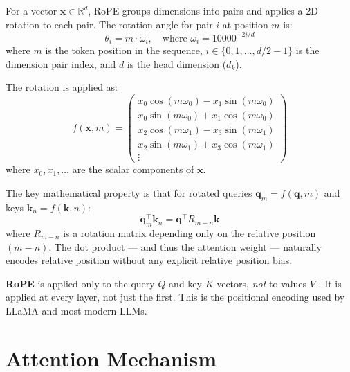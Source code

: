 \documentclass[11pt,a4paper]{article}
\newcommand{\R}{\mathbb{R}}
\newcommand{\dk}{d_k}
\begin{document}
For a vector $\bm{x} \in \R^d$, RoPE groups dimensions into pairs and applies a 2D
rotation to each pair. The rotation angle for pair $i$ at position $m$ is:
\begin{equation}
  \theta_i = m \cdot \omega_i, \quad \text{where } \omega_i = 10000^{-2i/d}
\end{equation}
where $m$ is the token position in the sequence, $i \in \{0, 1, \ldots, d/2 - 1\}$ is
the dimension pair index, and $d$ is the head dimension ($\dk$).

The rotation is applied as:
\begin{equation}
  f(\bm{x}, m) =
  \begin{pmatrix}
    x_0 \cos(m\omega_0) - x_1 \sin(m\omega_0) \\
    x_0 \sin(m\omega_0) + x_1 \cos(m\omega_0) \\
    x_2 \cos(m\omega_1) - x_3 \sin(m\omega_1) \\
    x_2 \sin(m\omega_1) + x_3 \cos(m\omega_1) \\
    \vdots
  \end{pmatrix}
\end{equation}
where $x_0, x_1, \ldots$ are the scalar components of $\bm{x}$.

The key mathematical property is that for rotated queries $\bm{q}_m = f(\bm{q}, m)$ and
keys $\bm{k}_n = f(\bm{k}, n)$:
\begin{equation}
  \bm{q}_m^\top \bm{k}_n = \bm{q}^\top R_{m-n} \bm{k}
\end{equation}
where $R_{m-n}$ is a rotation matrix depending only on the relative position $(m - n)$.
The dot product --- and thus the attention weight --- naturally encodes relative position
without any explicit relative position bias.

\begin{evobox}
\textbf{RoPE} is applied only to the query $Q$ and key $K$ vectors, \emph{not} to values
$V$ \cite{su2021}. It is applied at every layer, not just the first. This is the
positional encoding used by LLaMA \cite{touvron2023} and most modern LLMs.
\end{evobox}


\section{Attention Mechanism}
\label{sec:attention}
\end{document}
